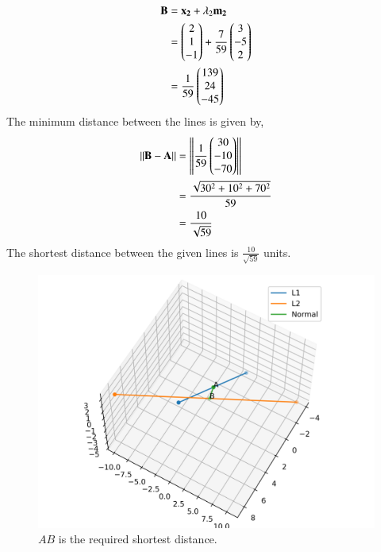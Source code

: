 \documentclass[journal,12pt,twocolumn]{IEEEtran}
\begin{document}
\begin{enumerate}
\begin{align}
\mathbf{B} &= \mathbf{x_2} + \lambda_2\mathbf{m_2}\\
&= \begin{pmatrix}2\\1\\-1\end{pmatrix} + \frac{7}{59}\begin{pmatrix}3\\-5\\2\end{pmatrix}\\
&= \frac{1}{59}\begin{pmatrix}139\\24\\-45\end{pmatrix}
\end{align}
The minimum distance between the lines is given by,
\begin{align}
\left\lVert\mathbf{B}-\mathbf{A}\right\rVert &= \left\lVert\frac{1}{59}\begin{pmatrix}30\\-10\\-70\end{pmatrix}\right\rVert\\
&= \frac{\sqrt{30^2+10^2+70^2}}{59}\\
&= \frac{10}{\sqrt{59}}
\end{align}
The shortest distance between the given lines is $\frac{10}{\sqrt{59}}$ units.

\begin{figure}[!ht]
\centering
\includegraphics[width=\columnwidth]{./figs/skew.png}
\caption{$AB$ is the required shortest distance.}
\end{figure}
\end{enumerate}
\end{document}
